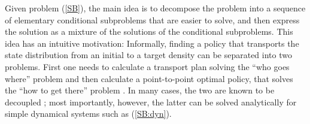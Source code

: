 \documentclass[twoside]{article}
\renewcommand{\eqref}[1]{(\ref{#1})}
\begin{document}

Given problem \eqref{SB}, the main idea is to decompose the problem into a sequence of elementary conditional subproblems that are easier to solve, and then express the solution as a mixture of the solutions of the conditional subproblems. 
This idea has an intuitive motivation: Informally, finding a policy that transports the state distribution from an initial to a target density can be separated into two problems. First one needs to calculate a transport plan solving the ``who goes where'' problem and then calculate a point-to-point optimal policy, that solves the ``how to get there'' problem \citep{terpin2024dynamic}. 
In many cases, the two are known to be decoupled \citep{chen2021stochastic, chen2016optimal, terpin2024dynamic}; 
most importantly, however, the latter can be solved analytically for simple dynamical systems such as \eqref{SB:dyn}.
\end{document}

